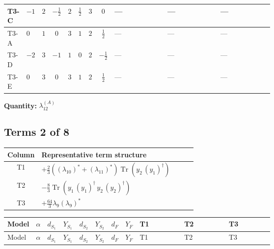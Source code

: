 \documentclass[8pt]{article}
\begin{document}
\begin{landscape}
\begin{longtable}{@{}llcccccc >{\raggedright\arraybackslash}p{0.21\linewidth} >{\raggedright\arraybackslash}p{0.21\linewidth} >{\raggedright\arraybackslash}p{0.21\linewidth}@{}}
\midrule
T3-C & $-1$ & $2$ & $-\frac{1}{2}$ & $2$ & $\frac{1}{2}$ & $3$ & $0$ & --- & --- & --- \\
\midrule
T3-A & $0$ & $1$ & $0$ & $3$ & $1$ & $2$ & $\frac{1}{2}$ & --- & --- & --- \\
\midrule
T3-D & $-2$ & $3$ & $-1$ & $1$ & $0$ & $2$ & $-\frac{1}{2}$ & --- & --- & --- \\
\midrule
T3-E & $0$ & $3$ & $0$ & $3$ & $1$ & $2$ & $\frac{1}{2}$ & --- & --- & --- \\
\midrule
\bottomrule
\end{longtable}
\clearpage
\noindent\textbf{Quantity: }$\lambda_{12}^{(A)}$\par\smallskip
\subsection*{Terms 2 of 8}
\begin{center}
\begin{tabular}{@{}c >{\raggedright\arraybackslash}p{0.82\linewidth}@{}}
\toprule
Column & Representative term structure \\
\midrule
T1 & \(\displaystyle +\frac{2}{3} (\left({\lambda_{10}}\right)^{*}+\left({\lambda_{11}}\right)^{*}) \operatorname{Tr}\!\left({y_2}\,\left({y_1}\right)^{\dagger}\right)\) \\
\midrule
T2 & \(\displaystyle -\frac{8}{3} \operatorname{Tr}\!\left({y_1}\,\left({y_1}\right)^{\dagger}\,{y_2}\,\left({y_2}\right)^{\dagger}\right)\) \\
\midrule
T3 & \(\displaystyle +\frac{64}{3} {\lambda_9} \left({\lambda_9}\right)^{*}\) \\
\midrule
\bottomrule
\end{tabular}
\end{center}
\smallskip
\tiny
\begin{longtable}{@{}llcccccc >{\raggedright\arraybackslash}p{0.21\linewidth} >{\raggedright\arraybackslash}p{0.21\linewidth} >{\raggedright\arraybackslash}p{0.21\linewidth}@{}}
\toprule
Model & $\alpha$ & $d_{S_1}$ & $Y_{S_1}$ & $d_{S_2}$ & $Y_{S_2}$ & $d_F$ & $Y_F$ & T1 & T2 & T3 \\
\midrule
\endfirsthead
\toprule
Model & $\alpha$ & $d_{S_1}$ & $Y_{S_1}$ & $d_{S_2}$ & $Y_{S_2}$ & $d_F$ & $Y_F$ & T1 & T2 & T3 \\
\midrule
\endhead

\end{longtable}
\end{landscape}
\end{document}
